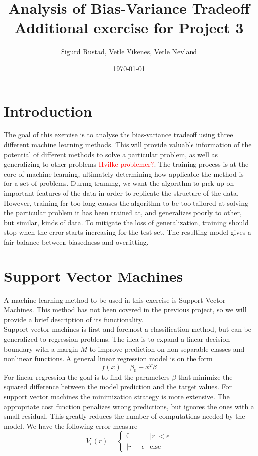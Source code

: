\documentclass[a4paper]{article}
\begin{document}
	\title{\textbf{\huge{Analysis of Bias-Variance Tradeoff}\\ \large{Additional exercise for Project 3}}}
	
	\author{\textbf\large{Sigurd Rustad, Vetle Vikenes, Vetle Nevland}}
	
	\date{\today}
	
	
	\maketitle
	
	
	\section{Introduction}
	The goal of this exercise is to analyse the bias-variance tradeoff using three different machine learning methods. This will provide valuable information of the potential of different methods to solve a particular problem, as well as generalizing to other problems \textcolor{red}{Hvilke problemer?}. The training process is at the core of machine learning, ultimately determining how applicable the method is for a set of problems. During training, we want the algorithm to pick up on important features of the data in order to replicate the structure of the data. However, training for too long causes the algorithm to be too tailored at solving the particular problem it has been trained at, and generalizes poorly to other, but similar, kinds of data. To mitigate the loss of generalization, training should stop when the error starts increasing for the test set. The resulting model gives a fair balance between biasedness and overfitting.
	
	\section{Support Vector Machines}
	A machine learning method to be used in this exercise is Support Vector Machines. This method has not been covered in the previous project, so we will provide a brief description of its functionality. \\
	
	Support vector machines is first and foremost a classification method, but can be generalized to regression problems. The idea is to expand a linear decision boundary with a margin $M$ to improve prediction on non-separable classes and nonlinear functions. A general linear regression model is on the form
	\[ f(x) = \beta_0 + x^T\beta \]
	For linear regression the goal is to find the parameters $\beta$ that minimize the squared difference between the model prediction and the target values. For support vector machines the minimization strategy is more extensive. The appropriate cost function penalizes wrong predictions, but ignores the ones with a small residual. This greatly reduces the number of computations needed by the model. We have the following error measure
	\[ V_{\epsilon}(r) = \begin{cases}
		0 & |r| < \epsilon \\
		|r| - \epsilon & \text{else}
	\end{cases} \]
	
\end{document}
